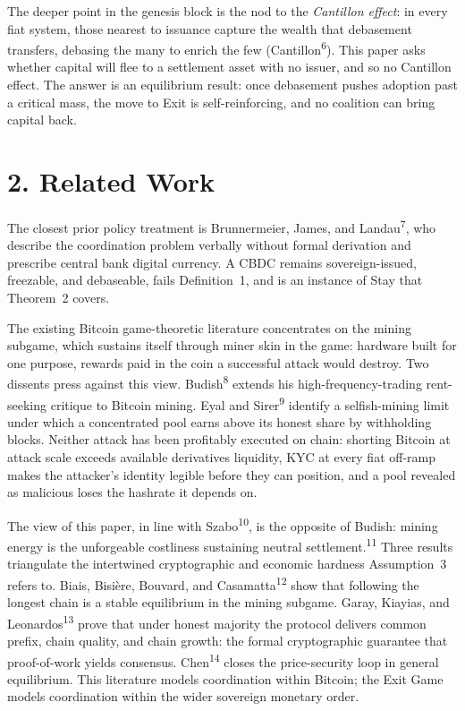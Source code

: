 \documentclass[12pt]{article}
\theoremstyle{definition}
\theoremstyle{remark}
\begin{document}
The deeper point in the genesis block is the nod to the \emph{Cantillon effect}: in every fiat system, those nearest to issuance capture the wealth that debasement transfers, debasing the many to enrich the few (Cantillon\textsuperscript{6}). This paper asks whether capital will flee to a settlement asset with no issuer, and so no Cantillon effect. The answer is an equilibrium result: once debasement pushes adoption past a critical mass, the move to Exit is self-reinforcing, and no coalition can bring capital back.

\newpage


\section{2. Related Work}

The closest prior policy treatment is
Brunnermeier, James, and Landau\textsuperscript{7}, who describe the
coordination problem verbally without formal derivation and prescribe
central bank digital currency. A CBDC remains sovereign-issued,
freezable, and debaseable, fails Definition~1, and is an instance of
Stay that Theorem~2 covers.

The existing Bitcoin game-theoretic literature concentrates on the mining subgame, which sustains itself through miner skin in the game: hardware built for one purpose, rewards paid in the coin a successful attack would destroy. Two dissents press against this view. Budish\textsuperscript{8} extends his high-frequency-trading rent-seeking critique to Bitcoin mining. Eyal and Sirer\textsuperscript{9} identify a selfish-mining limit under which a concentrated pool earns above its honest share by withholding blocks. Neither attack has been profitably executed on chain: shorting Bitcoin at attack scale exceeds available derivatives liquidity, KYC at every fiat off-ramp makes the attacker's identity legible before they can position, and a pool revealed as malicious loses the hashrate it depends on.

The view of this paper, in line with Szabo\textsuperscript{10}, is the opposite of Budish: mining energy is the unforgeable costliness sustaining neutral settlement.\textsuperscript{11} Three results triangulate the intertwined cryptographic and economic hardness Assumption~3 refers to. Biais, Bisi\`ere, Bouvard, and Casamatta\textsuperscript{12} show that following the longest chain is a stable equilibrium in the mining subgame. Garay, Kiayias, and Leonardos\textsuperscript{13} prove that under honest majority the protocol delivers common prefix, chain quality, and chain growth: the formal cryptographic guarantee that proof-of-work yields consensus. Chen\textsuperscript{14} closes the price-security loop in general equilibrium. This literature models coordination within Bitcoin; the Exit Game models coordination within the wider sovereign monetary order.
\end{document}
